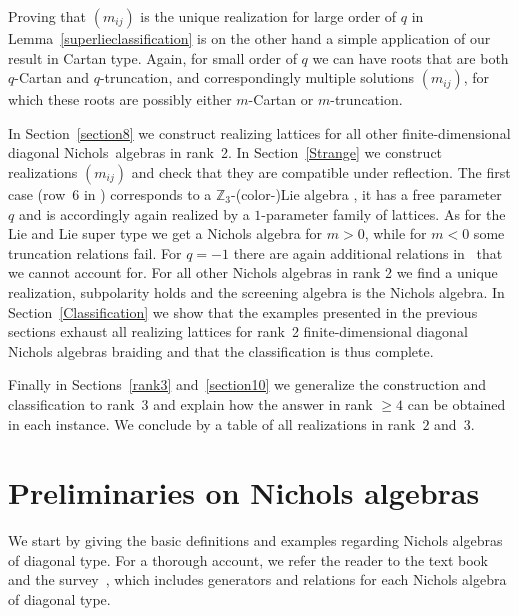 \documentclass[pdftex]{sigma}%
\numberwithin{equation}{section}
\newcommand{\Z}{\mathbb{Z}}
\begin{document}
Proving that $(m_{ij})$ is the unique realization for large order of $q$ in Lemma~\ref{superlieclassification} is on the other hand a simple application of our result in Cartan type. Again, for small order of $q$ we can have roots that are both $q$-Cartan and $q$-truncation, and correspondingly multiple solutions $(m_{ij})$, for which these roots are possibly either $m$-Cartan or $m$-truncation.

In Section~\ref{section8} we construct realizing lattices for all other finite-dimensional diagonal Nichols~algebras in rank~2. In Section~\ref{Strange} we construct realizations $(m_{ij})$ and check that they are compatible under reflection. The first case (row~6 in \cite[Table~1]{Hecklist}) corresponds to a $\Z_3$-(co\-lor-)Lie algebra \cite{AAB14, Yam07}, it has a free parameter~$q$ and is accordingly again realized by a $1$-parameter family of lattices. As for the Lie and Lie super type we get a Nichols algebra for $m>0$, while for $m<0$ some truncation relations fail. For $q=-1$ there are again additional relations in~\cite{AA17} that we cannot account for. For all other Nichols algebras in rank 2 we find a unique realization, subpolarity holds and the screening algebra is the Nichols algebra.
In Section~\ref{Classification} we show that the examples presented in the previous sections
exhaust all realizing lattices for rank~2 finite-dimensional diagonal
Nichols algebras braiding and that the classification is thus complete.

Finally in Sections~\ref{rank3} and~\ref{section10} we generalize the construction and classification to rank~3 and explain how the answer in rank $\geq 4$ can be obtained in each instance. We conclude by a table of all realizations in rank~$2$ and~$3$.

\section{Preliminaries on Nichols algebras}\label{section2}
We start by giving the basic definitions and examples regarding Nichols algebras of diagonal type. For a thorough account, we refer the reader to the text book~\cite{HS20} and the survey~\cite{AA17}, which includes generators and relations for each Nichols algebra of diagonal type.
\end{document}
